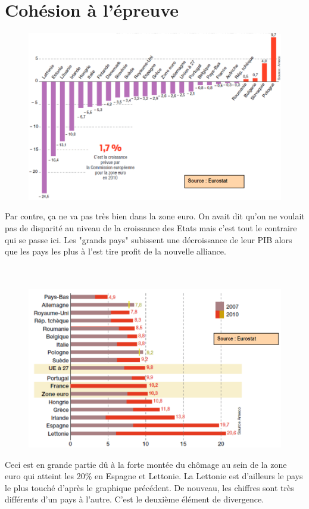 \section{Cohésion à l'épreuve}

\begin{figure}
	\includegraphics[scale=0.3]{30}
\end{figure}
\noindent Par contre, ça ne va pas très bien dans la zone euro. On avait dit qu'on ne voulait pas de disparité au niveau de la croissance des Etats mais c'est tout le contraire qui se passe ici. Les "grands pays" subissent une décroissance de leur PIB alors que les pays les plus à l'est tire profit de la nouvelle alliance. \\\\\\

\begin{figure}
	\includegraphics[scale=0.3]{31}
\end{figure}
\noindent Ceci est en grande partie dû à la forte montée du chômage au sein de la zone euro qui atteint les 20\% en Espagne et Lettonie. La Lettonie est d'ailleurs le pays le plus touché d'après le graphique précédent. De nouveau, les chiffres sont très différents d'un pays à l'autre. C'est le deuxième élément de divergence. \\\\\\

